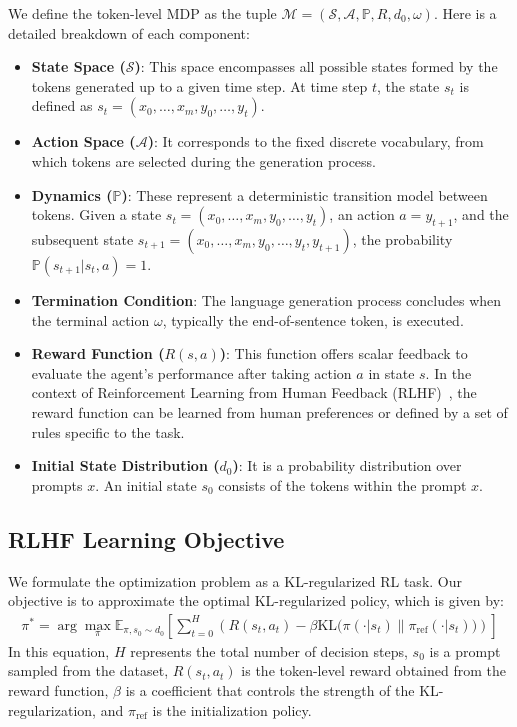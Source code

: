 We define the token-level MDP as the tuple $\mathcal{M}=(\mathcal{S},\mathcal{A},\mathbb{P},R,d_0,\omega)$. Here is a detailed breakdown of each component:
\begin{itemize}[leftmargin=*]
    \item \textbf{State Space ($\mathcal{S}$)}: This space encompasses all possible states formed by the tokens generated up to a given time step. At time step $t$, the state $s_t$ is defined as $s_t=(x_0,\dots,x_m,y_0,\dots,y_t)$.
    \item \textbf{Action Space ($\mathcal{A}$)}: It corresponds to the fixed discrete vocabulary, from which tokens are selected during the generation process.
    \item \textbf{Dynamics ($\mathbb{P}$)}: These represent a deterministic transition model between tokens. Given a state $s_t=(x_0,\dots,x_m,y_0,\dots,y_t)$, an action $a = y_{t + 1}$, and the subsequent state $s_{t+1}=(x_0,\dots,x_m,y_0,\dots,y_t,y_{t+1})$, the probability $\mathbb{P}(s_{t+1}|s_t,a)=1$.
    \item \textbf{Termination Condition}: The language generation process concludes when the terminal action $\omega$, typically the end-of-sentence token, is executed.
    \item \textbf{Reward Function ($R(s,a)$)}: This function offers scalar feedback to evaluate the agent's performance after taking action $a$ in state $s$. In the context of Reinforcement Learning from Human Feedback (RLHF)~\cite{rlhf,rlhf-sw}, the reward function can be learned from human preferences or defined by a set of rules specific to the task.
    \item \textbf{Initial State Distribution ($d_0$)}: It is a probability distribution over prompts $x$. An initial state $s_0$ consists of the tokens within the prompt $x$.
\end{itemize}

\subsection{RLHF Learning Objective}
We formulate the optimization problem as a KL-regularized RL task. Our objective is to approximate the optimal KL-regularized policy, which is given by:
\begin{align}\label{eq:objective}
   \pi^* =  \arg\max_\pi \mathbb{E}_{\pi, s_0 \sim d_0} \left[ \sum_{t = 0}^H  \left(R(s_t, a_t)-\beta \text{KL} \big( \pi(\cdot | s_t) \| \pi_{\text{ref}}(\cdot | s_t) \big)\right) \right]
\end{align}
In this equation, $H$ represents the total number of decision steps, $s_0$ is a prompt sampled from the dataset, $R(s_t, a_t)$ is the token-level reward obtained from the reward function, $\beta$ is a coefficient that controls the strength of the KL-regularization, and $\pi_{\text{ref}}$ is the initialization policy.

